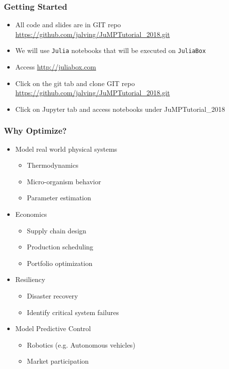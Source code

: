 \begin{frame}[t,fragile]  %
  \frametitle{Getting Started}
  \begin{itemize}
  \item All code and slides are in GIT repo \url{https://github.com/jalving/JuMPTutorial_2018.git}
    \item We will use {\tt Julia} notebooks that will be executed on {\tt JuliaBox}
    \item Access \url{http://juliabox.com}
    \item Click on the git tab and clone GIT repo \url{https://github.com/jalving/JuMPTutorial_2018.git}
    \item Click on Jupyter tab and access notebooks under JuMPTutorial_2018
  \end{itemize}
\end{frame}

\begin{frame}[t]
    \frametitle{Why Optimize?}
    \begin{itemize}
        \item Model real world physical systems
        \begin{itemize}
            \item Thermodynamics
            \item Micro-organism behavior
            \item Parameter estimation
        \end{itemize}
        \item Economics
        \begin{itemize}
            \item Supply chain design
            \item Production scheduling
            \item Portfolio optimization
        \end{itemize}
        \item Resiliency
        \begin{itemize}
            \item Disaster recovery
            \item Identify critical system failures
        \end{itemize}
        \item Model Predictive Control
        \begin{itemize}
            \item Robotics (e.g. Autonomous vehicles)
            \item Market participation
        \end{itemize}
    \end{itemize}

\end{frame}

